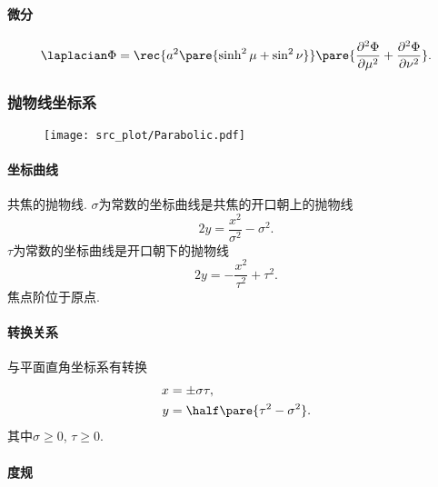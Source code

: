 \documentclass{article}
\begin{document}

\paragraph{微分} %
\label{par:微分}

\begin{align*}
    \laplacian \Phi = \rec{a^2\pare{\sinh^2\mu + \sin^2\nu}}\pare{\frac{\partial^2\Phi}{\partial \mu^2} + \frac{\partial^2\Phi}{\partial\nu^2}}.
\end{align*}



\subsubsection{抛物线坐标系} %
\label{ssub:抛物线坐标系}

\begin{figure}[ht]
    \centering
    \texttt{[image: src\_plot/Parabolic.pdf]}
\end{figure}

\paragraph{坐标曲线} %
\label{par:坐标曲线}

共焦的抛物线. $\sigma$为常数的坐标曲线是共焦的开口朝上的抛物线
\[ 2y = \frac{x^2}{\sigma^2} - \sigma^2. \]
$\tau$为常数的坐标曲线是开口朝下的抛物线
\[ 2y = -\frac{x^2}{\tau^2} + \tau^2. \]
焦点阶位于原点.


\paragraph{转换关系} %
\label{par:转换关系}

与平面直角坐标系有转换
\begin{align*}
    x &= \pm \sigma\tau, \\
    y &= \half\pare{\tau^2 - \sigma^2}.
\end{align*}
其中$\sigma\ge 0$, $\tau\ge 0$.


\paragraph{度规} %
\label{par:度规}
\end{document}
